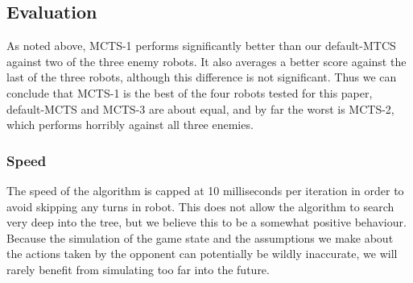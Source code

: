 \subsection{Evaluation}
As noted above, MCTS-1 performs significantly better than our default-MTCS against two of the three enemy robots. It also averages a better score against the last of the three robots, although this difference is not significant. Thus we can conclude that MCTS-1 is the best of the four robots tested for this paper, default-MCTS and MCTS-3 are about equal, and by far the worst is MCTS-2, which performs horribly against all three enemies.

\subsubsection{Speed}
The speed of the algorithm is capped at 10 milliseconds per iteration in order to avoid skipping any turns in robot. This does not allow the algorithm to search very deep into the tree, but we believe this to be a somewhat positive behaviour. Because the simulation of the game state and the assumptions we make about the actions taken by the opponent can potentially be wildly inaccurate, we will rarely benefit from simulating too far into the future.
